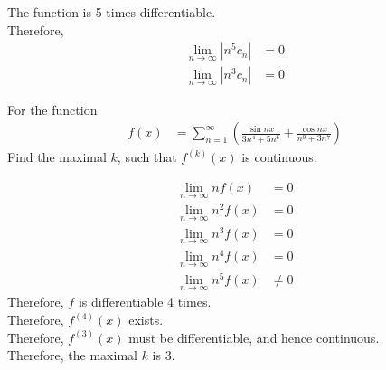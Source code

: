 \documentclass[fleqn, a4paper, 11pt, oneside]{amsart}
\theoremstyle{definition}
\theoremstyle{theorem}
\begin{document}
\begin{solution}
	The function is 5 times differentiable.\\
	Therefore,
	\begin{align*}
		\lim\limits_{n \to \infty} \left| n^5 c_n \right| & = 0 \\
		\lim\limits_{n \to \infty} \left| n^3 c_n \right| & = 0
	\end{align*}
\end{solution}

\begin{question}
	For the function
	\begin{align*}
		f(x) & = \sum\limits_{n = 1}^{\infty} \left( \frac{\sin n x}{3 n^4 + 5 n^6} + \frac{\cos n x}{n^9 + 3 n^7} \right)
	\end{align*}
	Find the maximal $k$, such that $f^{(k)}(x)$ is continuous.
\end{question}

\begin{solution}
	\begin{align*}
		\lim\limits_{n \to \infty} n f(x)   & = 0 \\
		\lim\limits_{n \to \infty} n^2 f(x) & = 0 \\
		\lim\limits_{n \to \infty} n^3 f(x) & = 0 \\
		\lim\limits_{n \to \infty} n^4 f(x) & = 0 \\
		\lim\limits_{n \to \infty} n^5 f(x) & \neq 0
	\end{align*}
	Therefore, $f$ is differentiable 4 times.\\
	Therefore, $f^{(4)}(x)$ exists.\\
	Therefore, $f^{(3)}(x)$ must be differentiable, and hence continuous.\\
	Therefore, the maximal $k$ is $3$.
\end{solution}
\end{document}
